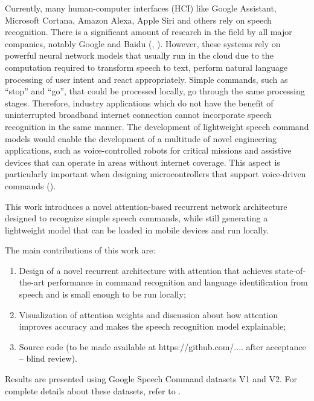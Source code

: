 \documentclass[authoryear, review, 12pt, 3p]{elsarticle}
\begin{document}
Currently, many human-computer interfaces (HCI) like Google Assistant, Microsoft Cortana, Amazon Alexa, Apple Siri and others rely on speech recognition. There is a significant amount of research in the field by all major companies, notably Google and Baidu (\cite{DBLP:journals/corr/AmodeiABCCCCCCD15}, \cite{DBLP:journals/corr/abs-1712-01769}). However, these systems rely on powerful neural network models that usually run in the cloud due to the computation required to transform speech to text, perform natural language processing of user intent and react appropriately. Simple commands, such as ``stop'' and ``go'', that could be processed locally, go through the same processing stages. Therefore, industry applications which do not have the benefit of uninterrupted broadband internet connection cannot incorporate speech recognition in the same manner. The development of lightweight speech command models would enable the development of a multitude of novel engineering applications, such as voice-controlled robots for critical missions and assistive devices that can operate in areas without internet coverage. This aspect is particularly important when designing microcontrollers that support voice-driven commands (\cite{DBLP:journals/corr/abs-1711-07128}).



This work introduces a novel attention-based recurrent network architecture designed to recognize simple speech commands, while still generating a lightweight model that can be loaded in mobile devices and run locally.

The main contributions of this work are:

\begin{enumerate}
    \item Design of a novel recurrent architecture with attention that achieves state-of-the-art performance in command recognition and language identification from speech and is small enough to be run locally;
    \item Visualization of attention weights and discussion about how attention improves accuracy and makes the speech recognition model explainable;
    \item Source code (to be made available at https://github.com/.... after acceptance -- blind review).
\end{enumerate}



Results are presented using Google Speech Command datasets V1 and V2. For complete details about these datasets, refer to \cite{DBLP:journals/corr/abs-1804-03209}.
\end{document}
